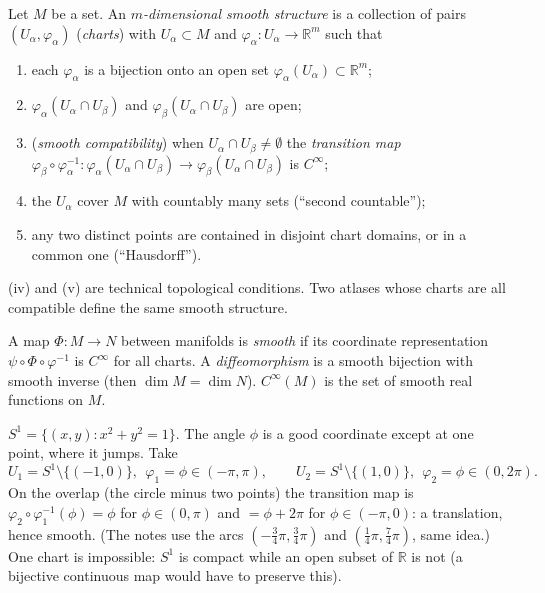 \documentclass[11pt,a4paper]{article}
\numberwithin{equation}{section}
\theoremstyle{definition}
\theoremstyle{plain}
\newcommand{\R}{\mathbb{R}}
\begin{document}
\begin{formal}
Let $M$ be a set. An \emph{$m$-dimensional smooth structure} is a collection of pairs $(U_\alpha,\varphi_\alpha)$ (\emph{charts}) with $U_\alpha\subset M$ and $\varphi_\alpha:U_\alpha\to\R^m$ such that
\begin{enumerate}[label=(\roman*),nosep]
\item each $\varphi_\alpha$ is a bijection onto an open set $\varphi_\alpha(U_\alpha)\subset\R^m$;
\item $\varphi_\alpha(U_\alpha\cap U_\beta)$ and $\varphi_\beta(U_\alpha\cap U_\beta)$ are open;
\item (\emph{smooth compatibility}) when $U_\alpha\cap U_\beta\ne\emptyset$ the \emph{transition map}
$\varphi_\beta\circ\varphi_\alpha^{-1}:\varphi_\alpha(U_\alpha\cap U_\beta)\to\varphi_\beta(U_\alpha\cap U_\beta)$ is $C^\infty$;
\item the $U_\alpha$ cover $M$ with countably many sets (``second countable'');
\item any two distinct points are contained in disjoint chart domains, or in a common one (``Hausdorff'').
\end{enumerate}
(iv) and (v) are technical topological conditions. Two atlases whose charts are all compatible define the same smooth structure.

A map $\Phi:M\to N$ between manifolds is \emph{smooth} if its coordinate representation $\psi\circ\Phi\circ\varphi^{-1}$ is $C^\infty$ for all charts. A \emph{diffeomorphism} is a smooth bijection with smooth inverse (then $\dim M=\dim N$). $C^\infty(M)$ is the set of smooth real functions on $M$.
\end{formal}

\begin{example}
$S^1=\{(x,y):x^2+y^2=1\}$. The angle $\phi$ is a good coordinate except at one point, where it jumps. Take
\[
U_1=S^1\setminus\{(-1,0)\},\ \ \varphi_1=\phi\in(-\pi,\pi),\qquad
U_2=S^1\setminus\{(1,0)\},\ \ \varphi_2=\phi\in(0,2\pi).
\]
On the overlap (the circle minus two points) the transition map is $\varphi_2\circ\varphi_1^{-1}(\phi)=\phi$ for $\phi\in(0,\pi)$ and $=\phi+2\pi$ for $\phi\in(-\pi,0)$: a translation, hence smooth. (The notes use the arcs $(-\tfrac34\pi,\tfrac34\pi)$ and $(\tfrac14\pi,\tfrac74\pi)$, same idea.) One chart is impossible: $S^1$ is compact while an open subset of $\R$ is not (a bijective continuous map would have to preserve this).
\end{example}
\end{document}

